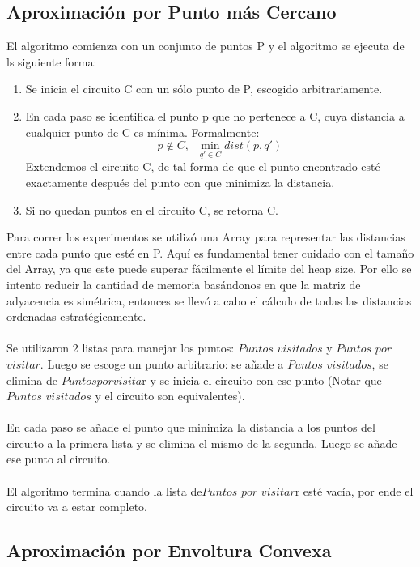 \documentclass[12pt,letterpaper, margin = 3cm]{article}
\begin{document}
\subsection{Aproximación por Punto más Cercano}
El algoritmo comienza con un conjunto de puntos P y el algoritmo se ejecuta de ls siguiente forma:
\begin{enumerate}
\item Se inicia el circuito C con un sólo punto de P, escogido arbitrariamente.
\item En cada paso se identifica el punto p que no pertenece a C, cuya distancia a cualquier punto de C es mínima. Formalmente:
 \[ p\not\in{C},\;\; \min_{q'\in{C}} dist(p,q') \] Extendemos el circuito C, de tal forma de que el punto encontrado esté exactamente después del punto con que minimiza la distancia.
\item Si no quedan puntos en el circuito C, se retorna C.
\end{enumerate}

Para correr los experimentos se utilizó una Array para representar las distancias entre cada punto que esté en P. Aquí es fundamental tener cuidado con el tamaño del Array, ya que este puede superar fácilmente el límite del heap size. Por ello se intento reducir la cantidad de memoria basándonos en que la matriz de adyacencia es simétrica, entonces se llevó a cabo el cálculo de todas las distancias ordenadas estratégicamente.\\ \\
Se utilizaron 2 listas para manejar los puntos: $Puntos$ $ visitados$ y $Puntos$ $por$ $visitar$.
Luego se escoge un punto arbitrario: se añade a  $Puntos$ $ visitados$, se elimina de $Puntos por visita$r y se inicia el circuito con ese punto (Notar que  $Puntos$ $ visitados$ y el circuito son equivalentes). \\ \\
En cada paso se añade el punto que minimiza la distancia a los puntos del circuito a la primera lista y se elimina el mismo de la segunda. Luego se añade ese punto al circuito.\\ \\
El algoritmo termina cuando la lista de$Puntos$ $por$ $visitar$r esté vacía, por ende el circuito va a estar completo.

\subsection{Aproximación por Envoltura Convexa}
\end{document}
